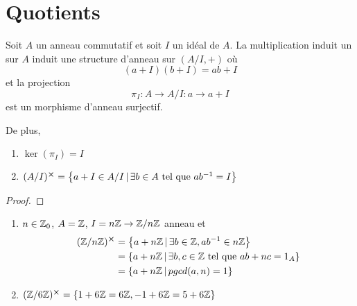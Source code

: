 \section{Quotients}

\begin{proposition}
	Soit $A$ un anneau commutatif et soit $I$ un idéal de $A$.
	La multiplication induit un sur $A$ induit une structure d'anneau sur $(A/I,
	+)$ où
	\begin{equation}
		(a + I) (b + I) = ab + I
	\end{equation}
	et la projection
	\begin{equation}
		\pi_{I} : A \rightarrow A / I : a \rightarrow a + I
	\end{equation}
	est un morphisme d'anneau surjectif.

	De plus,
	\begin{enumerate}
		\item $\ker(\pi_{I}) = I$
		\item $(A / I)^{\cross} = \left\{a + I \in A / I \, | \, \exists b \in A
				\text{ tel que } ab^{-1} = I \right\}$
	\end{enumerate}
\end{proposition}

\ifdefined\outputproof
\begin{proof}

\end{proof}
\fi

\begin{exemple}
	\begin{enumerate}
		\item $n \in \mathbb{Z}_{0}$, $A = \mathbb{Z}$, $I = n \mathbb{Z} \rightarrow
			\mathbb{Z} / n \mathbb{Z}$ anneau et
			\begin{align}
				(\mathbb{Z} / n \mathbb{Z})^{\cross} &= \left\{a +
				n\mathbb{Z} \, | \, \exists b \in \mathbb{Z}, ab^{-1} \in n\mathbb{Z} \right\} \\
				& = \left\{a + n \mathbb{Z} \, | \, \exists b, c \in \mathbb{Z} \text{
				tel que } a b + n c = 1_{A} \right\} \\
				& = \left\{a + n \mathbb{Z} \, | \, pgcd(a, n) = 1 \right\}
			\end{align}
		\item $(\mathbb{Z} / 6 \mathbb{Z})^{\cross} = \left\{ 1 + 6\mathbb{Z} = 6\mathbb{Z}, -1 +
			6\mathbb{Z} = 5 + 6 \mathbb{Z} \right\}$
	\end{enumerate}
\end{exemple}

